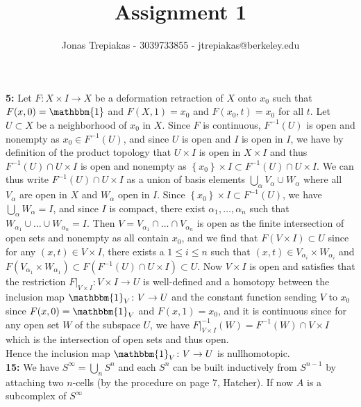\documentclass[a4paper]{article}
\title{Assignment 1}
\author{Jonas Trepiakas - 3039733855 - jtrepiakas@berkeley.edu}
\date{}
\begin{document}
\maketitle
\newpage



\textbf{5:} Let $F  \colon X \times I \to X$ be a deformation retraction of $X$ onto
$x_0$ such that $F(x,0) = \mathbbm{1}$ and $F (X,1) = x_0$ and $F(x_0,t)= x_0$
for all $t$. Let $U \subset X$ be a neighborhood of $x_0$ in $X$. Since
$F$ is continuous, $F^{-1}(U)$ is open and nonempty as $x_0 \in F^{-1}(U)$,
and since $U$ is open and $I$ is open
in $I$, we have by definition of the product topology that
$U \times I$ is open in $X \times I$ and thus $F^{-1}(U) \cap U \times I$ is
open and nonempty as $\left\{ x_0 \right\}  \times I \subset F^{-1}(U) \cap
U \times I$. We can thus write $F^{-1}(U) \cap U \times I$ as a union of basis
elements $\bigcup_{\alpha} 
V_{\alpha} \cup W_{\alpha}$ where all $V_{\alpha}$ are open in $X$ and
$W_{\alpha}$ open in $I$. Since $\left\{ x_0 \right\} \times I \subset
F^{-1}(U)$, we have $\bigcup_{\alpha} W_{\alpha} = I$, and since $I$ is
compact, there exist $\alpha_1, \ldots, \alpha_n$ such that
$W_{\alpha_1} \cup \ldots \cup W_{\alpha_n} = I$. Then
$V = V_{\alpha_1} \cap \ldots \cap V_{\alpha_n} $ is open as the finite
intersection of open sets and nonempty as all contain $x_0$, and we find that
$F (V \times I) \subset U$ since for any $(x,t) \in V \times I$, there exists a 
$1 \le i \le n$ such that $(x,t) \in V_{\alpha_i} \times W_{\alpha_i}$ and
$F\left( V_{\alpha_1} \times W_{\alpha_1} \right) \subset F \left( F^{-1}\left(
U\right) \cap U \times I \right) \subset U$. Now $V \times I$ is open and satisfies
that the restriction $F|_{V \times I}  \colon V \times I \to U$ is well-defined and a homotopy between the
inclusion map
$\mathbbm{1}_{V}  \colon V \to U$  and the constant function sending $V$ to
$x_0$ since
$F(x,0) = \mathbbm{1}_{V}$ and $F(x,1) = x_0$, and it is continuous since
 for any open set $W$ of the subspace $U$, we have
 $F|_{V \times I}^{-1}\left( W \right) =
 F^{-1}\left( W \right) \cap V \times I$ which is the intersection of open sets
 and thus open.\\
 Hence the inclusion map $\mathbbm{1}_{V}  \colon V \to U$ is nullhomotopic.\\
\linebreak
\textbf{15:} We have $S^{\infty} = \bigcup_{n} S^{n}$ and each
$S^{n}$ can be built inductively from $S^{n-1}$ by attaching two $n$-cells (by
the procedure on page 7, Hatcher). If now $A$ is a subcomplex of  $S^{\infty}$ 
\end{document}
